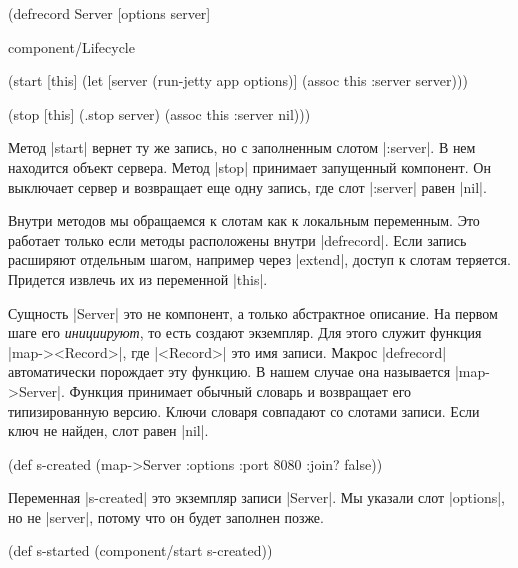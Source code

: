\begin{english}
  \begin{clojure}
(defrecord Server [options server]

  component/Lifecycle

  (start [this]
    (let [server (run-jetty app options)]
      (assoc this :server server)))

  (stop [this]
    (.stop server)
    (assoc this :server nil)))
  \end{clojure}
\end{english}

Метод \spverb|start| вернет ту же запись, но с заполненным слотом
\spverb|:server|. В нем находится объект сервера. Метод \spverb|stop| принимает
запущенный компонент. Он выключает сервер и возвращает еще одну запись, где слот
\spverb|:server| равен \spverb|nil|.

Внутри методов мы обращаемся к слотам как к локальным переменным. Это работает
только если методы расположены внутри \spverb|defrecord|. Если запись расширяют
отдельным шагом, например через \spverb|extend|, доступ к слотам
теряется. Придется извлечь их из переменной \spverb|this|.

Сущность \spverb|Server| это не компонент, а только абстрактное описание. На
первом шаге его \emph{инициируют}, то есть создают экземпляр. Для этого служит
функция \spverb|map-><Record>|, где \spverb|<Record>| это имя записи. Макрос
\spverb|defrecord| автоматически порождает эту функцию. В нашем случае она
называется \spverb|map->Server|. Функция принимает обычный словарь и возвращает
его типизированную версию. Ключи словаря совпадают со слотами записи. Если ключ
не найден, слот равен \spverb|nil|.

\begin{english}
  \begin{clojure}
(def s-created
  (map->Server
   {:options {:port 8080 :join? false}}))
  \end{clojure}
\end{english}

Переменная \spverb|s-created| это экземпляр записи \spverb|Server|. Мы указали
слот \spverb|options|, но не \spverb|server|, потому что он будет заполнен
позже.

\begin{english}
  \begin{clojure}
(def s-started (component/start s-created))
  \end{clojure}
\end{english}


